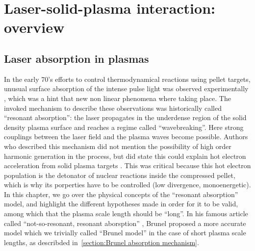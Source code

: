 \chapter{Laser-solid-plasma interaction: overview}
\minitoc

\section{Laser absorption in plasmas}
\label{sec:LaserAbsorptions}

In the early 70's efforts to control thermodynamical reactions using pellet targets\cite{nuckolls1972laser}, unusual surface absorption of the intense pulse light was observed experimentally \cite{self1976lawrence,brueckner1974laser,priedhorsky1981hard}, which was a hint that new non linear phenomena where taking place. The invoked mechanism to describe these observations was historically called ``resonant absorption'': the laser propagates in the underdense region of the solid density plasma  surface and reaches a regime called ``wavebreaking''. Here strong couplings between the laser field and the plasma waves become possible. Authors who described this mechanism did not mention the possibility of high order harmonic generation in the process, but did state this could explain hot electron acceleration from solid plasma targets \cite{freidberg1972resonant,albritton1975cold}. This was critical because this hot electron population is the detonator of nuclear reactions inside the compressed pellet, which is why its porperties have to be controlled (low divergence, monoenergetic).\\
 In this chapter, we go over the physical concepts of the ``resonant absorption'' model, and highlight the different hypotheses made in order for it to be valid, among which that the plasma scale length should be ``long''. In his famous article called ``not-so-resonant, resonant aborsption'' \cite{Brunel1987}, Brunel proposed a more accurate model which we trivially called ``Brunel model''  in the case of short plasma scale lengths, as describded in~\ref{section:Brunel absorption mechanism}.





